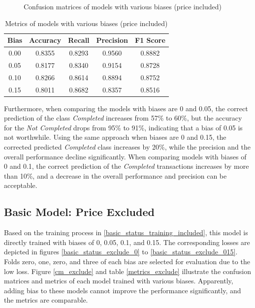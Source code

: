 \documentclass[12pt,twoside]{report}
\begin{document}
\begin{figure}[!htbp]
	\hfill
	\caption{Confusion matrices of models with various biases (price included)}
	\label{status_bias_cm}
\end{figure}

\begin{table}[!htbp]
	\centering
	\caption{Metrics of models with various biases (price included)}
	\label{status_bias_metrics}
	\begin{tabular}{| c | c | c | c | c |}
		\hline
		Bias & Accuracy & Recall & Precision & F1 Score \\
		\hline
		0.00 & 0.8355 & 0.8293 & 0.9560 & 0.8882 \\
		\hline
		0.05 & 0.8177 & 0.8340 & 0.9154 & 0.8728 \\
		\hline
		0.10 & 0.8266 & 0.8614 & 0.8894 & 0.8752 \\
		\hline
		0.15 & 0.8011 & 0.8682 & 0.8357 & 0.8516 \\
		\hline
	\end{tabular}
\end{table}

Furthermore, when comparing the models with biases are 0 and 0.05, the correct prediction of the class \textit{Completed} increases from 57\% to 60\%, but the accuracy for the \textit{Not Completed} drops from 95\% to 91\%, indicating that a bias of 0.05 is not worthwhile. Using the same approach when biases are 0 and 0.15, the corrected predicted \textit{Completed} class increases by 20\%, while the precision and the overall performance decline significantly. When comparing models with biases of 0 and 0.1, the correct prediction of the \textit{Completed} transactions increases by more than 10\%, and a decrease in the overall performance and precision can be acceptable. 

\subsection{Basic Model: Price Excluded}
Based on the training process in \ref{basic_status_training_included}, this model is directly trained with biases of 0, 0.05, 0.1, and 0.15. The corresponding losses are depicted in figures \ref{basic_status_exclude_0} to \ref{basic_status_exclude_015}. Folds zero, one, zero, and three of each bias are selected for evaluation due to the low loss. Figure \ref{cm_exclude} and table \ref{metrics_exclude} illustrate the confusion matrices and metrics of each model trained with various biases. Apparently, adding bias to these models cannot improve the performance significantly, and the metrics are comparable.
\end{document}
